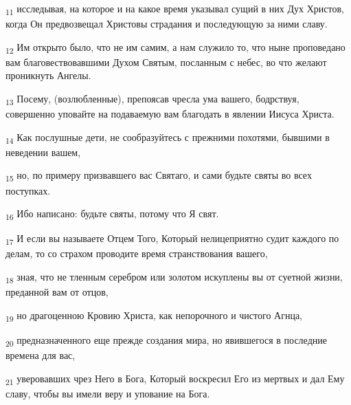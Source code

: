 \begin{tcolorbox}
\textsubscript{11} исследывая, на которое и на какое время указывал сущий в них Дух Христов, когда Он предвозвещал Христовы страдания и последующую за ними славу.
\end{tcolorbox}
\begin{tcolorbox}
\textsubscript{12} Им открыто было, что не им самим, а нам служило то, что ныне проповедано вам благовествовавшими Духом Святым, посланным с небес, во что желают проникнуть Ангелы.
\end{tcolorbox}
\begin{tcolorbox}
\textsubscript{13} Посему, (возлюбленные), препоясав чресла ума вашего, бодрствуя, совершенно уповайте на подаваемую вам благодать в явлении Иисуса Христа.
\end{tcolorbox}
\begin{tcolorbox}
\textsubscript{14} Как послушные дети, не сообразуйтесь с прежними похотями, бывшими в неведении вашем,
\end{tcolorbox}
\begin{tcolorbox}
\textsubscript{15} но, по примеру призвавшего вас Святаго, и сами будьте святы во всех поступках.
\end{tcolorbox}
\begin{tcolorbox}
\textsubscript{16} Ибо написано: будьте святы, потому что Я свят.
\end{tcolorbox}
\begin{tcolorbox}
\textsubscript{17} И если вы называете Отцем Того, Который нелицеприятно судит каждого по делам, то со страхом проводите время странствования вашего,
\end{tcolorbox}
\begin{tcolorbox}
\textsubscript{18} зная, что не тленным серебром или золотом искуплены вы от суетной жизни, преданной вам от отцов,
\end{tcolorbox}
\begin{tcolorbox}
\textsubscript{19} но драгоценною Кровию Христа, как непорочного и чистого Агнца,
\end{tcolorbox}
\begin{tcolorbox}
\textsubscript{20} предназначенного еще прежде создания мира, но явившегося в последние времена для вас,
\end{tcolorbox}
\begin{tcolorbox}
\textsubscript{21} уверовавших чрез Него в Бога, Который воскресил Его из мертвых и дал Ему славу, чтобы вы имели веру и упование на Бога.
\end{tcolorbox}
